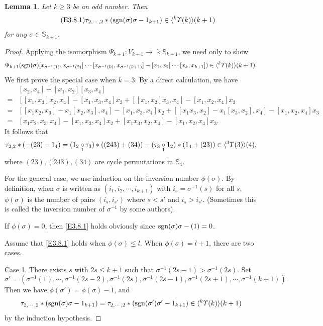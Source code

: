 \documentclass{amsart}
\newtheorem{lem}[thm]{Lemma}
\theoremstyle{definition}
\theoremstyle{remark}
\numberwithin{equation}{section}
\def\S{\mathbb{S}}
\def\sgn{{\rm sgn}}
\newcommand{\lr}[1]{\langle #1 \rangle}
\newcommand{\ucr}[1]{\underset{#1}{\circ}}
\newcommand{\up}[1]{{^{#1}{\it \!\Upsilon}}}
\def \S{\mathbb{S}}
\begin{document}
\begin{lem}
\label{yylem3.8}
Let $k\geq 3$ be an odd number. Then 
\begin{align}
\label{E3.8.1}\tag{E3.8.1}
\tau_{2, \cdots, 2}\ast (\sgn(\sigma)\sigma-1_{k+1})
\in \lr{\up{k}(k)}(k+1)
\end{align}
for any $\sigma\in \S_{k+1}$. 
\end{lem}


\begin{proof}
Applying the isomorphism 
$\Psi_{k+1}\colon V_{k+1}\to \Bbbk\S_{k+1}$, we need only 
to show
\[\Psi_{k+1}(\sgn(\sigma)[x_{\sigma^{-1}(1)}, x_{\sigma^{-1}(2)}]
\cdots [x_{\sigma^{-1}(k)}, x_{\sigma^{-1}(k+1)}]
-[x_1, x_2]\cdots[x_{k}, x_{k+1}])\in \lr{\up{k}(k)}(k+1).\]
We first prove the special case when $k=3$. By a direct calculation, 
we have
\begin{align*}
[x_1, x_3]&[x_2, x_4]+[x_1, x_2][x_3, x_4]\\
=& [[x_1, x_3]x_2, x_4]-[x_1, x_3, x_4]x_2
 +[[x_1, x_2]x_3, x_4]-[x_1, x_2, x_4]x_3\\
=& [[x_1x_2, x_3]-x_1[x_2, x_3], x_4]
 -[x_1, x_3, x_4]x_2+[[x_1x_3, x_2]-x_1[x_3, x_2], x_4]
 -[x_1, x_2, x_4]x_3\\
=& [x_1x_2, x_3, x_4]-[x_1, x_3, x_4]x_2
 +[x_1x_3, x_2, x_4]-[x_1, x_2, x_4]x_3.
\end{align*}
It follows that 
\[\tau_{2, 2}\ast (-(23)-1_{4})
=(1_2\ucr{1}\tau_3)\ast((243)+(34))
-(\tau_3\ucr{1}1_2)\ast(1_{4}+(23))\in \lr{\up{3}(3)}(4),\]
where $(23), (243), (34)$ are cycle permutations in 
$\S_{4}$. 

For the general case, we use induction on the inversion 
number $\phi(\sigma)$. By definition, when $\sigma$ is 
written as $(i_1, i_2, \cdots, i_{k+1})$ with 
$i_s=\sigma^{-1}(s)$ for all $s$, $\phi(\sigma)$ is the 
number of pairs $(i_{s},i_{s'})$ where $s<s'$ and $i_s>i_{s'}$. 
(Sometimes this is called the inversion number of 
$\sigma^{-1}$ by some authors).

If $\phi(\sigma)=0$, then \eqref{E3.8.1} holds obviously 
since $\sgn(\sigma)\sigma-(1)=0$.

Assume that \eqref{E3.8.1} holds when $\phi(\sigma)\le l$. 
When $\phi(\sigma)=l+1$, there are two cases. 

Case 1. There exists $s$ with $2s\le k+1$ such that 
$\sigma^{-1}(2s-1)>\sigma^{-1}(2s)$. 
Set \[\sigma'=(\sigma^{-1}(1), \cdots, \sigma^{-1}(2s-2), 
\sigma^{-1}(2s), \sigma^{-1}(2s-1),
\sigma^{-1}(2s+1), \cdots, \sigma^{-1}(k+1)).\] 
Then we have 
$\phi(\sigma')=\phi(\sigma)-1$, and 
\begin{align*}
 \tau_{2, \cdots, 2}\ast (\sgn(\sigma)\sigma-1_{k+1})
=\tau_{2, \cdots, 2}\ast (\sgn(\sigma')\sigma'-1_{k+1})
\in \lr{\up{k}(k)}(k+1)
\end{align*}
by the induction hypothesis.


\end{proof}
\end{document}
